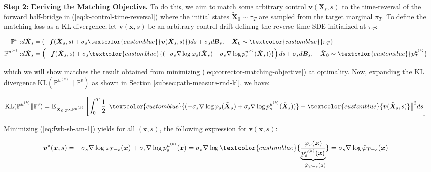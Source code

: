 \documentclass{article}
\newcommand{\bluetext}[1]{\textcolor{customblue}{#1}}
\begin{document}
\textbf{Step 2: Deriving the Matching Objective.} 
To do this, we aim to match some arbitrary control $\boldsymbol{v}(\boldsymbol{X}_s,s)$ to the time-reversal of the forward half-bridge in (\ref{eq:k-control-time-reversal}) where the initial states $\tilde{\boldsymbol{X}}_0\sim \pi_T$ are sampled from the target marginal $\pi_T$. To define the matching loss as a KL divergence, let $\boldsymbol{v}(\boldsymbol{x},s)$ be an arbitrary control drift defining the reverse-time SDE initialized at $\pi_T$:
\begin{small}
\begin{align}
    \mathbb{P}^v: &d\tilde{\boldsymbol{X}}_s=(-\boldsymbol{f}(\tilde{\boldsymbol{X}}_s,s)+\sigma_s\bluetext{\boldsymbol{v}(\tilde{\boldsymbol{X}}_s, s)}) ds+ \sigma_sd\boldsymbol{B}_s,\quad \tilde{\boldsymbol{X}}_0\sim \bluetext{\pi_T}\label{eq:sb-am-bwd-sde}\\
    \mathbb{P}^{u^{(k)}}: &d\tilde{\boldsymbol{X}}_s=\left(-\boldsymbol{f}(\tilde{\boldsymbol{X}}_s,s)+\sigma_s\bluetext{(-\sigma_s\nabla \log \varphi_s(\tilde{\boldsymbol{X}}_s)+\sigma_s\nabla \log p^{u^{(k)}}_s(\tilde{\boldsymbol{X}}_s))}\right)ds + \sigma_sd\boldsymbol{B}_s,  \quad \tilde{\boldsymbol{X}}_0\sim \bluetext{p^{u^{(k)}}_T}
\end{align}
\end{small}
which we will show matches the result obtained from minimizing (\ref{eq:corrector-matching-objective}) at optimality. Now, expanding the KL divergence $\text{KL}(\mathbb{P}^{u^{(k)}}\|\mathbb{P}^v)$ as shown in Section \ref{subsec:path-measure-rnd-kl}, we have:
\begin{small}
\begin{align}
    \text{KL}(\mathbb{P}^{u^{(k)}}\|\mathbb{P}^v)=\mathbb{E}_{\boldsymbol{X}_{0:T}\sim \mathbb{P}^{u^{(k)}}}\left[\int_0^T\frac{1}{2}\big\|\bluetext{(-\sigma_s\nabla \log \varphi_s(\tilde{\boldsymbol{X}}_s)+\sigma_s\nabla \log p^{u^{(k)}}_s(\tilde{\boldsymbol{X}}_s))}-\bluetext{\boldsymbol{v}(\tilde{\boldsymbol{X}}_s, s)}\big\|^2ds\right]\label{eq:fwb-sb-am-1}
\end{align}
\end{small}
Minimizing (\ref{eq:fwb-sb-am-1}) yields for all $(\boldsymbol{x},s)$, the following expression for $\boldsymbol{v}(\boldsymbol{x},s)$:
\begin{small}
\begin{align}
    \boldsymbol{v}^\star(\boldsymbol{x},s)=-\sigma_s\nabla \log \varphi_{T-s}(\boldsymbol{x})+\sigma_s\nabla \log p^{u^{(k)}}_s(\boldsymbol{x})=\sigma_s\nabla \log \bluetext{\underbrace{\frac{\varphi_s(\boldsymbol{x})}{p^{u^{(k)}}_s(\boldsymbol{x})}}_{=\hat{\varphi}_{T-s}(\boldsymbol{x})}}=\sigma_s\nabla \log \hat{\varphi}_{T-s}(\boldsymbol{x})
\end{align}
\end{small}
\end{document}
